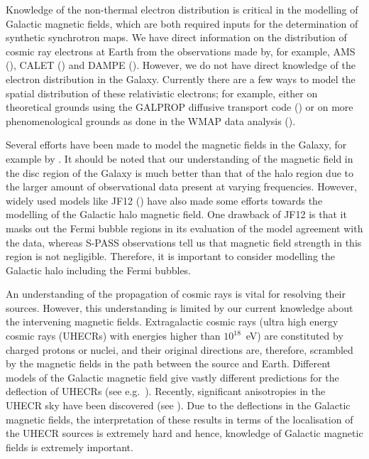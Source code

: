 \documentclass[usenatbib]{mnras}
\begin{document}
Knowledge of the non-thermal electron distribution is critical in the modelling of Galactic magnetic fields, which are both required inputs for the determination of synthetic synchrotron maps.
We have direct information on the distribution of cosmic ray electrons at Earth from the observations made by, for example, AMS (\cite{AMS_2002, AMS_2014}), CALET (\cite{Calet_2017}) and DAMPE (\cite{Dampe_2017}). However, we do not have direct knowledge of the electron distribution in the Galaxy.
Currently there are a few ways to model the spatial distribution of these relativistic electrons; for example, either on theoretical grounds using the GALPROP diffusive transport code (\cite{Hammurabi, Orlando_2011}) or on more phenomenological grounds as done in the WMAP data analysis (\cite{WMAP_Page}).


Several efforts have been made to model the magnetic fields in the Galaxy, for example by \cite{Sun_2008, Jaffe_2010, Jaffe_2011, JF12}. It should be noted that our understanding of the magnetic field in the disc region of the Galaxy is much better than that of the halo region due to the larger amount of observational data present at varying frequencies. However, widely used models like JF12 (\cite{JF12}) have also made some efforts towards the modelling of the Galactic halo magnetic field. One drawback of JF12 is that it masks out the Fermi bubble regions in its evaluation of the model agreement with the data, whereas S-PASS  observations \citep{Carretti_2013} tell us that magnetic field strength in this region is not negligible. Therefore, it is important to consider modelling the Galactic halo including the Fermi bubbles.

An understanding of the propagation of cosmic rays is vital for resolving their sources. However, this understanding is limited by our current knowledge about the intervening magnetic fields. Extragalactic cosmic rays (ultra high energy cosmic rays (UHECRs) with energies higher than $10^{18}$~eV) are constituted by charged protons or nuclei, and their original directions are, therefore, scrambled by the magnetic fields in the path between the source and Earth. Different models of the Galactic magnetic field give vastly different predictions for the deflection of UHECRs (see e.g.~\cite{Sun_2008, Sun_2010, PT11_2011, JF12, FARRAR_2014}). Recently, significant anisotropies in the UHECR sky have been discovered (see \cite{TA_2014, Auger_Starburst2018, ICRC_2019, ICRC_2021}). Due to the deflections in the Galactic magnetic fields, the interpretation of these results in terms of the localisation of the UHECR sources is extremely hard and hence, knowledge of Galactic magnetic fields is extremely important. 
\end{document}
